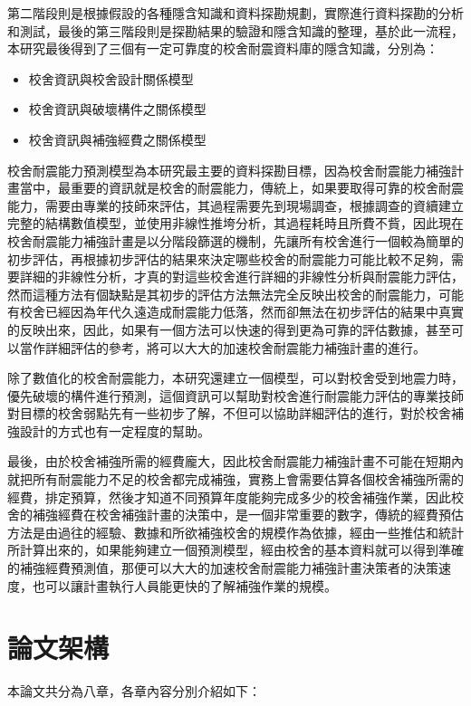 第二階段則是根據假設的各種隱含知識和資料探勘規劃，實際進行資料探勘的分析和測試，最後的第三階段則是探勘結果的驗證和隱含知識的整理，基於此一流程，本研究最後得到了三個有一定可靠度的校舍耐震資料庫的隱含知識，分別為：

\begin{itemize}
\item 校舍資訊與校舍設計關係模型
\item 校舍資訊與破壞構件之關係模型
\item 校舍資訊與補強經費之關係模型
\end{itemize}

校舍耐震能力預測模型為本研究最主要的資料探勘目標，因為校舍耐震能力補強計畫當中，最重要的資訊就是校舍的耐震能力，傳統上，如果要取得可靠的校舍耐震能力，需要由專業的技師來評估，其過程需要先到現場調查，根據調查的資續建立完整的結構數值模型，並使用非線性推垮分析，其過程耗時且所費不貲，因此現在校舍耐震能力補強計畫是以分階段篩選的機制，先讓所有校舍進行一個較為簡單的初步評估，再根據初步評估的結果來決定哪些校舍的耐震能力可能比較不足夠，需要詳細的非線性分析，才真的對這些校舍進行詳細的非線性分析與耐震能力評估，然而這種方法有個缺點是其初步的評估方法無法完全反映出校舍的耐震能力，可能有校舍已經因為年代久遠造成耐震能力低落，然而卻無法在初步評估的結果中真實的反映出來，因此，如果有一個方法可以快速的得到更為可靠的評估數據，甚至可以當作詳細評估的參考，將可以大大的加速校舍耐震能力補強計畫的進行。

除了數值化的校舍耐震能力，本研究還建立一個模型，可以對校舍受到地震力時，優先破壞的構件進行預測，這個資訊可以幫助對校舍進行耐震能力評估的專業技師對目標的校舍弱點先有一些初步了解，不但可以協助詳細評估的進行，對於校舍補強設計的方式也有一定程度的幫助。

最後，由於校舍補強所需的經費龐大，因此校舍耐震能力補強計畫不可能在短期內就把所有耐震能力不足的校舍都完成補強，實務上會需要估算各個校舍補強所需的經費，排定預算，然後才知道不同預算年度能夠完成多少的校舍補強作業，因此校舍的補強經費在校舍補強計畫的決策中，是一個非常重要的數字，傳統的經費預估方法是由過往的經驗、數據和所欲補強校舍的規模作為依據，經由一些推估和統計所計算出來的，如果能夠建立一個預測模型，經由校舍的基本資料就可以得到準確的補強經費預測值，那便可以大大的加速校舍耐震能力補強計畫決策者的決策速度，也可以讓計畫執行人員能更快的了解補強作業的規模。

\section{論文架構}

本論文共分為八章，各章內容分別介紹如下：

